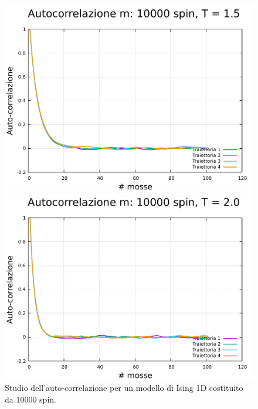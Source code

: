\begin{figure}[htbp]
    \begin{minipage}{0.45\textwidth}  
      \centering
      \includegraphics[page=1, width=\textwidth]{Immagini/simIsing1D/magn0.0/tcorr/auto_10000_1.5.pdf}
      \caption{$T\,=\,1.5$}
    \end{minipage}\hfill
    \begin{minipage}{0.45\textwidth}  
      \centering
      \includegraphics[page=1, width=\textwidth]{Immagini/simIsing1D/magn0.0/tcorr/auto_10000_2.0.pdf}
      \caption{$T\,=\,2.0$}
    \end{minipage}
    \caption{Studio dell'auto-correlazione per un modello di Ising 1D costituito da 10000 spin.}
\end{figure}

